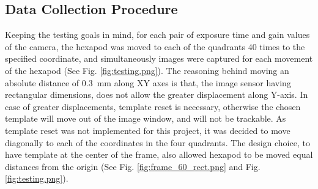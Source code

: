 \subsection*{Data Collection Procedure}
Keeping the testing goals in mind, for each pair of exposure time and gain values of the camera, the hexapod was moved to each of the quadrants 40 times to the specified coordinate, and simultaneously images were captured for each movement of the hexapod (See Fig. \ref{fig:testing.png}). The reasoning behind moving an absolute distance of \SI{0.3}{\milli\meter} along XY axes is that, the image sensor having rectangular dimensions, does not allow the greater displacement along Y-axis. In case of greater displacements, template reset is necessary, otherwise the chosen template will move out of the image window, and will not be trackable. As template reset was not implemented for this project, it was decided to move diagonally to each of the coordinates in the four quadrants. The design choice, to have template at the center of the frame, also allowed hexapod to be moved equal distances from the origin (See Fig. \ref{fig:frame_60_rect.png} and Fig. \ref{fig:testing.png}).